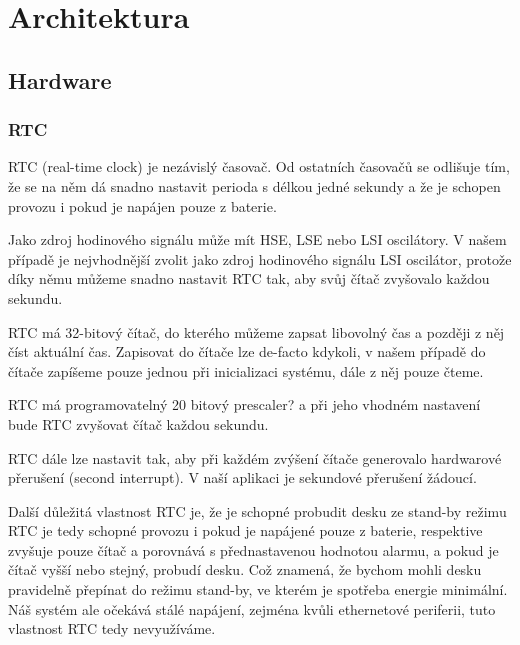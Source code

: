 \chapter{Architektura}

\section{Hardware}

\subsection{RTC}
RTC (real-time clock) je nezávislý časovač.
Od ostatních časovačů se odlišuje tím, že se na něm dá snadno nastavit perioda
s délkou jedné sekundy a že je schopen provozu i pokud je napájen pouze z
baterie.

Jako zdroj hodinového signálu může mít HSE, LSE nebo LSI oscilátory.
V našem případě je nejvhodnější zvolit jako zdroj hodinového signálu LSI oscilátor,
protože díky němu můžeme snadno nastavit RTC tak, aby svůj čítač zvyšovalo
každou sekundu.

RTC má 32-bitový čítač, do kterého můžeme zapsat libovolný čas a později z
něj číst aktuální čas.
Zapisovat do čítače lze de-facto kdykoli, v našem případě do čítače zapíšeme
pouze jednou při inicializaci systému, dále z něj pouze čteme.

RTC má programovatelný 20 bitový prescaler? a při jeho vhodném nastavení bude
RTC zvyšovat čítač každou sekundu.

RTC dále lze nastavit tak, aby při každém zvýšení čítače generovalo hardwarové
přerušení (second interrupt).
V naší aplikaci je sekundové přerušení žádoucí.

Další důležitá vlastnost RTC je, že je schopné probudit desku ze stand-by režimu
RTC je tedy schopné provozu i pokud je napájené pouze z baterie, respektive
zvyšuje pouze čítač a porovnává s přednastavenou hodnotou alarmu, a pokud je
čítač vyšší nebo stejný, probudí desku.
Což znamená, že bychom mohli desku pravidelně přepínat do režimu stand-by, ve
kterém je spotřeba energie minimální.
Náš systém ale očekává stálé napájení, zejména kvůli ethernetové periferii,
tuto vlastnost RTC tedy nevyužíváme.

